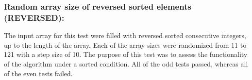 \documentclass[12pt]{article}
\begin{document}
\subsubsection{Random array size of reversed sorted elements (REVERSED): }
The input array for this test were filled with reversed sorted consecutive integers, up to the length of the array. Each of the array sizes were randomized from 11 to 121 with a step size of 10. The purpose of this test was to assess the functionality of the algorithm under a sorted condition. All of the odd tests passed, whereas all of the even tests failed. 
\begin{table}[H]
	\centering
	\caption{Random array size with reversed consecutive sorted elements}
	\label{my-label}
\end{table}
\end{document}
